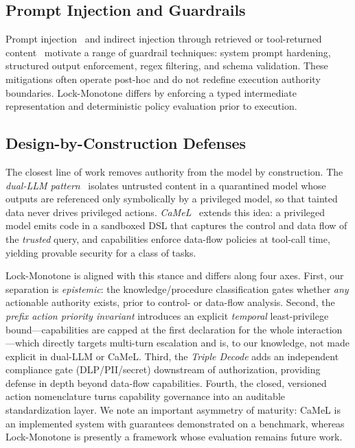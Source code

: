 \documentclass[conference]{IEEEtran}
\begin{document}
\subsection{Prompt Injection and Guardrails}
Prompt injection~\cite{zou2023universal} and indirect injection through
retrieved or tool-returned content~\cite{greshake2023notwhat,
liu2023promptinjection} motivate a range of guardrail techniques: system
prompt hardening, structured output enforcement, regex filtering, and
schema validation. These mitigations often operate post-hoc and do not
redefine execution authority boundaries. Lock-Monotone differs by
enforcing a typed intermediate representation and deterministic policy
evaluation prior to execution.

\subsection{Design-by-Construction Defenses}
The closest line of work removes authority from the model by construction.
The \emph{dual-LLM pattern}~\cite{willison2023dual} isolates untrusted
content in a quarantined model whose outputs are referenced only
symbolically by a privileged model, so that tainted data never drives
privileged actions. \emph{CaMeL}~\cite{debenedetti2025camel} extends this
idea: a privileged model emits code in a sandboxed DSL that captures the
control and data flow of the \emph{trusted} query, and capabilities
enforce data-flow policies at tool-call time, yielding provable security
for a class of tasks.

Lock-Monotone is aligned with this stance and differs along four axes.
First, our separation is \emph{epistemic}: the knowledge/procedure
classification gates whether \emph{any} actionable authority exists, prior
to control- or data-flow analysis. Second, the \emph{prefix action
priority invariant} introduces an explicit \emph{temporal} least-privilege
bound---capabilities are capped at the first declaration for the whole
interaction---which directly targets multi-turn escalation and is, to our
knowledge, not made explicit in dual-LLM or CaMeL. Third, the
\emph{Triple Decode} adds an independent compliance gate (DLP/PII/secret)
downstream of authorization, providing defense in depth beyond data-flow
capabilities. Fourth, the closed, versioned action nomenclature turns
capability governance into an auditable standardization layer. We note an
important asymmetry of maturity: CaMeL is an implemented system with
guarantees demonstrated on a benchmark, whereas Lock-Monotone is presently
a framework whose evaluation remains future work.
\end{document}
